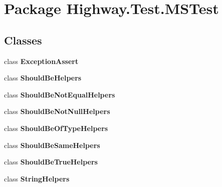 \hypertarget{namespace_highway_1_1_test_1_1_m_s_test}{\section{Package Highway.\-Test.\-M\-S\-Test}
\label{namespace_highway_1_1_test_1_1_m_s_test}
}
\subsection*{Classes}
\begin{DoxyCompactItemize}
\item 
class {\bfseries Exception\-Assert}
\item 
class {\bfseries Should\-Be\-Helpers}
\item 
class {\bfseries Should\-Be\-Not\-Equal\-Helpers}
\item 
class {\bfseries Should\-Be\-Not\-Null\-Helpers}
\item 
class {\bfseries Should\-Be\-Of\-Type\-Helpers}
\item 
class {\bfseries Should\-Be\-Same\-Helpers}
\item 
class {\bfseries Should\-Be\-True\-Helpers}
\item 
class {\bfseries String\-Helpers}
\end{DoxyCompactItemize}
